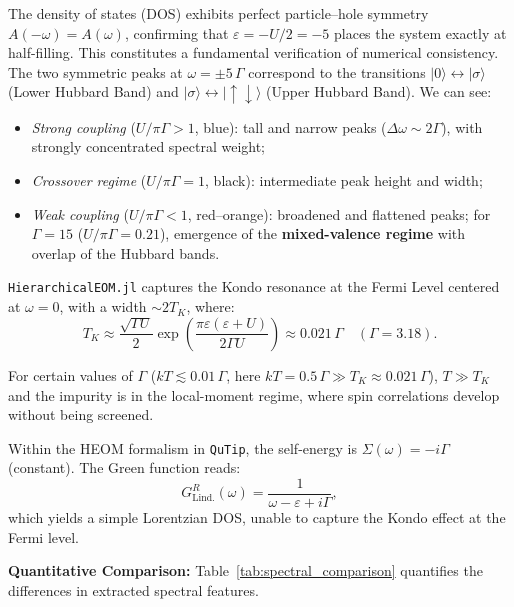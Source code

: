 \documentclass[preprint,1p]{elsarticle}
\begin{document}
The density of states (DOS) exhibits perfect particle--hole symmetry $A(-\omega)=A(\omega)$, confirming that $\varepsilon=-U/2=-5$ places the system exactly at half-filling. This constitutes a fundamental verification of numerical consistency. The two symmetric peaks at $\omega=\pm 5\,\Gamma$ correspond to the transitions $|0\rangle\leftrightarrow|\sigma\rangle$ (Lower Hubbard Band) and $|\sigma\rangle\leftrightarrow|\!\uparrow\downarrow\rangle$ (Upper Hubbard Band). We can see:
%
\begin{itemize}
	\item \textit{Strong coupling} ($U/\pi\Gamma>1$, blue):
	tall and narrow peaks ($\Delta\omega\sim 2\Gamma$),
	with strongly concentrated spectral weight;
	\item \textit{Crossover regime} ($U/\pi\Gamma=1$, black):
	intermediate peak height and width;
	\item \textit{Weak coupling} ($U/\pi\Gamma<1$, red--orange):
	broadened and flattened peaks; for $\Gamma=15$
	($U/\pi\Gamma=0.21$), emergence of the \textbf{mixed-valence
		regime} with overlap of the Hubbard bands.
\end{itemize}

\texttt{HierarchicalEOM.jl} captures the Kondo resonance at the Fermi Level centered at $\omega=0$, with a width $\sim 2T_{K}$, where:
\begin{equation}
	T_{K}\approx\frac{\sqrt{\Gamma U}}{2}
	\exp\!\left(\frac{\pi\varepsilon(\varepsilon+U)}{2\Gamma U}\right)
	\approx 0.021\,\Gamma
	\quad(\Gamma=3.18).
	\label{eq:TK}
\end{equation}

For certain values of $\Gamma$ ($kT\lesssim 0.01\,\Gamma$, here $kT=0.5\,\Gamma\gg T_{K}\approx 0.021\,\Gamma$), $T \gg T_{K}$ and the impurity is in the local-moment regime,
where spin correlations develop without being screened.


Within the HEOM formalism in \texttt{QuTip},
the self-energy is $\Sigma(\omega)=-i\Gamma$ (constant).
The Green function reads:
%
\begin{equation}
	G^{R}_{\text{Lind.}}(\omega)
	= \frac{1}{\omega-\varepsilon+i\Gamma},
\end{equation}
%
which yields a simple Lorentzian DOS,
unable to capture the Kondo effect at the Fermi level. 


\textbf{Quantitative Comparison:}
Table~\ref{tab:spectral_comparison} quantifies the differences in extracted spectral features.
\end{document}

